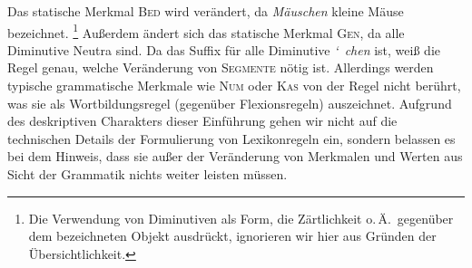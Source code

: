 \begin{exe}
\end{exe}

Das statische Merkmal \textsc{Bed} wird verändert, da \textit{Mäuschen} kleine Mäuse bezeichnet.%
\footnote{Die Verwendung von Diminutiven als Form, die Zärtlichkeit o.\,Ä.\ gegenüber dem bezeichneten Objekt ausdrückt, ignorieren wir hier aus Gründen der Übersichtlichkeit.}
Außerdem ändert sich das statische Merkmal \textsc{Gen}, da alle Diminutive Neutra sind.
Da das Suffix für alle Diminutive \mbox{\textit{\char`~chen}} ist, weiß die Regel genau, welche Veränderung von \textsc{Segmente} nötig ist.
Allerdings werden typische grammatische Merkmale wie \textsc{Num} oder \textsc{Kas} von der Regel nicht berührt, was sie als Wortbildungsregel (gegenüber Flexionsregeln) auszeichnet.
Aufgrund des deskriptiven Charakters dieser Einführung gehen wir nicht auf die technischen Details der Formulierung von Lexikonregeln ein, sondern belassen es bei dem Hinweis, dass sie außer der Veränderung von Merkmalen und Werten aus Sicht der Grammatik nichts weiter leisten müssen.


